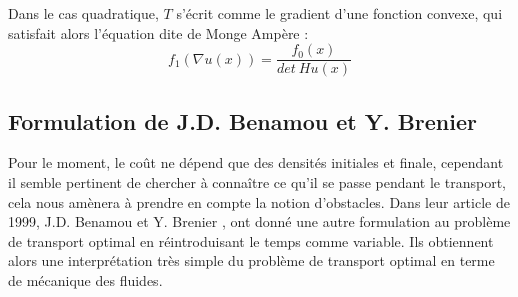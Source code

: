 \documentclass[a4paper,12pt]{article}
\begin{document}
Dans le cas quadratique, $T$ s'écrit comme le gradient d'une fonction convexe, qui satisfait alors l'équation dite de Monge Ampère : 
\begin{equation}
\tag{MA}
f_1(\nabla u(x)) = \frac{f_0(x)}{det\ H u(x)}
\label{eq:mongemapere}
\end{equation}






\subsection{Formulation de J.D. Benamou et Y. Brenier}
Pour le moment, le coût ne dépend que des densités initiales et finale, cependant il semble pertinent de chercher à connaître ce qu'il se passe pendant le transport, cela nous amènera à prendre en compte la notion d'obstacles. 
Dans leur article de 1999, J.D. Benamou et Y. Brenier \cite{benamoubrenier}, ont donné une autre formulation au problème de transport optimal en réintroduisant le temps comme variable. Ils obtiennent alors une interprétation très simple du problème de transport optimal en terme de mécanique des fluides. 
\end{document}
